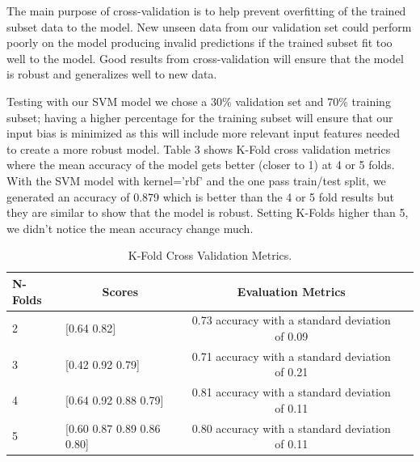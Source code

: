 \documentclass[11pt]{article}
\begin{document}
The main purpose of cross-validation is to help prevent overfitting of the trained subset data to the model. New unseen data from our validation set could perform poorly on the model producing invalid predictions if the trained subset fit too well to the model. Good results from cross-validation will ensure that the model is robust and generalizes well to new data. \cite{geekforgeeks2023}

Testing with our SVM model we chose a 30\% validation set and 70\% training subset; having a higher percentage for the training subset will ensure that our input bias is minimized as this will include more relevant input features needed to create a more robust model. Table 3 shows K-Fold cross validation metrics where the mean accuracy of the model gets better (closer to 1) at 4 or 5 folds. With the SVM model with kernel=’rbf’ and the one pass train/test split, we generated an accuracy of 0.879 which is better than the 4 or 5 fold results but they are similar to show that the model is robust. Setting K-Folds higher than 5, we didn’t notice the mean accuracy change much.



\begin{table}[hbt!]
   \large
   \centering
   \begin{tabular}{lccr}
   \hline
   \textbf{N-Folds} & \textbf{Scores} & \textbf{Evaluation Metrics} \\ 
   \hline
   2 & \multicolumn{1}{l}{[0.64 0.82]} & 0.73 accuracy with a standard deviation of 0.09 \\
   3 & \multicolumn{1}{l}{[0.42 0.92 0.79]} & 0.71 accuracy with a standard deviation of 0.21 \\
   4 & \multicolumn{1}{l}{[0.64 0.92 0.88 0.79]} & 0.81 accuracy with a standard deviation of 0.11 \\
   5 & \multicolumn{1}{l}{[0.60 0.87 0.89 0.86 0.80]} & 0.80 accuracy with a standard deviation of 0.11 \\
   \hline
   \end{tabular}
   \caption{K-Fold Cross Validation Metrics.} 
\end{table}

\end{document}
